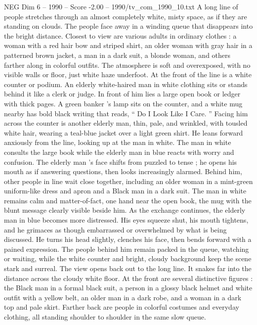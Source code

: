 \begin{textsample}{NEG Dim 6 – 1990 – Score -2.00 – 1990/tv\_com\_1990\_10.txt}  \label{ex:f6_neg_022}
A long line of people stretches through an almost completely white, misty space, as if they are standing on clouds.
The people face away in a winding queue that disappears into the bright distance.
Closest to view are various adults in ordinary clothes : a woman with a red hair bow and striped shirt, an older woman with gray hair in a patterned brown jacket, a man in a dark suit, a blonde woman, and others farther along in colorful outfits.
The atmosphere is soft and overexposed, with no visible walls or floor, just white haze underfoot.
At the front of the line is a white counter or podium.
An elderly white-haired man in white clothing sits or stands behind it like a clerk or judge.
In front of him lies a large open book or ledger with thick pages.
A green banker ’s lamp sits on the counter, and a white mug nearby has bold black writing that reads, “ Do I Look Like I Care. ” Facing him across the counter is another elderly man, thin, pale, and wrinkled, with tousled white hair, wearing a teal-blue jacket over a light green shirt.
He leans forward anxiously from the line, looking up at the man in white.
The man in white consults the large book while the elderly man in blue reacts with worry and confusion.
The elderly man ’s face shifts from puzzled to tense ; he opens his mouth as if answering questions, then looks increasingly alarmed.
Behind him, other people in line wait close together, including an older woman in a mint-green uniform-like dress and apron and a Black man in a dark suit.
The man in white remains calm and matter-of-fact, one hand near the open book, the mug with the blunt message clearly visible beside him.
As the exchange continues, the elderly man in blue becomes more distressed.
His eyes squeeze shut, his mouth tightens, and he grimaces as though embarrassed or overwhelmed by what is being discussed.
He turns his head slightly, clenches his face, then bends forward with a pained expression.
The people behind him remain packed in the queue, watching or waiting, while the white counter and bright, cloudy background keep the scene stark and surreal.
The view opens back out to the long line.
It snakes far into the distance across the cloudy white floor.
At the front are several distinctive figures : the Black man in a formal black suit, a person in a glossy black helmet and white outfit with a yellow belt, an older man in a dark robe, and a woman in a dark top and pale skirt.
Farther back are people in colorful costumes and everyday clothing, all standing shoulder to shoulder in the same slow queue.

\end{textsample}
